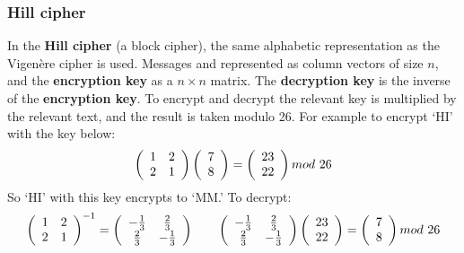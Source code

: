 \documentclass[final]{article}
\begin{document}
\subsubsection{Hill cipher}
In the \textbf{Hill cipher} (a block cipher), the same alphabetic representation as the Vigen\`{e}re cipher is used. Messages and represented as column vectors of size $ n $, and the \textbf{encryption key} as a $ n \times n $ matrix. The \textbf{decryption key} is the inverse of the \textbf{encryption key}. To encrypt and decrypt the relevant key is multiplied by the relevant text, and the result is taken modulo 26. For example to encrypt `HI' with the key below:
\[
	\left(
	\begin{array}{c c}
		1 & 2 \\
		2 & 1
	\end{array}
	\right)
	\left(
	\begin{array}{c}
		7 \\
		8
	\end{array}
	\right)
	=
	\left(
	\begin{array}{c}
		23 \\
		22
	\end{array}
	\right)
	mod\ 26
\]
So `HI' with this key encrypts to `MM.' To decrypt:
\[
	\left(
	\begin{array}{c c}
		1 & 2 \\
		2 & 1
	\end{array}
	\right)^{-1}
	=
	\left(
	\begin{array}{c c}
		-\frac{1}{3} & \frac{2}{3} \\
		\frac{2}{3} & -\frac{1}{3}
	\end{array}
	\right)
	\hspace{20pt}
	\left(
	\begin{array}{c c}
		-\frac{1}{3} & \frac{2}{3} \\
		\frac{2}{3} & -\frac{1}{3}
	\end{array}
	\right)
	\left(
	\begin{array}{c}
		23 \\
		22
	\end{array}
	\right)
	=
	\left(
	\begin{array}{c}
		7 \\
		8
	\end{array}
	\right)
	mod\ 26
\]
\end{document}
